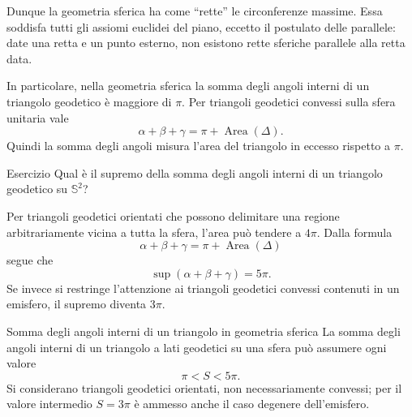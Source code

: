 \documentclass[a4paper]{article}
\begin{document}
Dunque la geometria sferica ha come ``rette'' le circonferenze massime. Essa soddisfa tutti gli assiomi euclidei del piano, eccetto il postulato delle parallele: date una retta e un punto esterno, non esistono rette sferiche parallele alla retta data.

In particolare, nella geometria sferica la somma degli angoli interni di un triangolo geodetico è maggiore di \(\pi\). Per triangoli geodetici convessi sulla sfera unitaria vale
\[
    \alpha+\beta+\gamma
    =
    \pi+\operatorname{Area}(\Delta).
\]
Quindi la somma degli angoli misura l'area del triangolo in eccesso rispetto a \(\pi\).

\begin{snippetexample}{Esercizio}
Qual è il supremo della somma degli angoli interni di un triangolo geodetico su \(\mathbb{S}^2\)?
\end{snippetexample}

\begin{snippetsolution}{}
Per triangoli geodetici orientati che possono delimitare una regione arbitrariamente vicina a tutta la sfera, l'area può tendere a \(4\pi\). Dalla formula
\[
    \alpha+\beta+\gamma
    =
    \pi+\operatorname{Area}(\Delta)
\]
segue che
\[
    \sup(\alpha+\beta+\gamma)=5\pi.
\]
Se invece si restringe l'attenzione ai triangoli geodetici convessi contenuti in un emisfero, il supremo diventa \(3\pi\).
\end{snippetsolution}

\pagebreak



\begin{snippetproposition}{Somma degli angoli interni di un triangolo in geometria sferica}
    La somma degli angoli interni di un triangolo a lati geodetici su una sfera può assumere ogni valore
    \[
        \pi<S<5\pi.
    \]
    Si considerano triangoli geodetici orientati, non necessariamente convessi; per il valore intermedio
    \(S=3\pi\) è ammesso anche il caso degenere dell'emisfero.
\end{snippetproposition}
\end{document}
